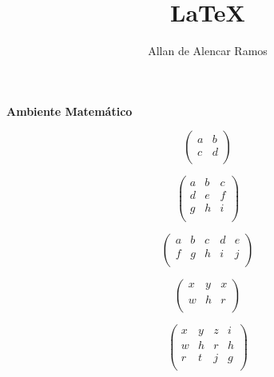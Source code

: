 \documentclass[12pt, a4paper]{article}
\begin{document}
\title{LaTeX}
\author{Allan de Alencar Ramos}
\maketitle

\begin{center}
\large\textbf{Ambiente Matemático}
\end{center}
\vspace{0.5cm}



\begin{equation}
\left(
\begin{array}{lr}
	a & b \\
	c & d \\
\end{array}
\right)
\end{equation}

\begin{equation}
\left(
\begin{array}{lcr}
	a & b & c\\
	d & e &  f \\
	g & h & i \\
\end{array}
\right)
\end{equation}

\begin{equation}
\left(
\begin{array}{llcrr}
	a & b & c & d & e \\
	f & g & h & i & j \\
\end{array}
\right)
\end{equation}


\begin{equation}
\begin{pmatrix}
	x & y & x \\
	w & h & r \\
\end{pmatrix}
\end{equation}

\begin{equation}
\begin{pmatrix}
	x & y & z & i \\
	w & h & r & h \\
	r & t & j & g \\
\end{pmatrix}
\end{equation}
\end{document}
